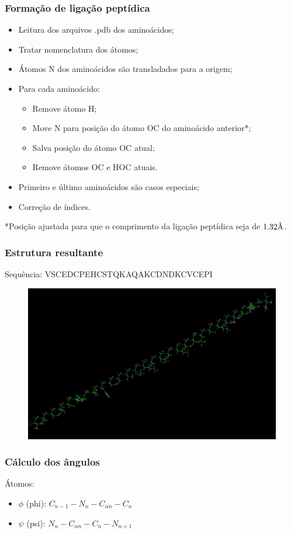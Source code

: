 \documentclass{beamer}
\newcommand{\angstrom}{\textup{\AA}}
\begin{document}
\begin{frame}
\frametitle{Formação de ligação peptídica}
\begin{itemize}
\item Leitura dos arquivos .pdb dos aminoácidos;
\item Tratar nomenclatura dos átomos;
\item Átomos N dos aminoácidos são transladados para a origem;
\item Para cada aminoácido:
\begin{itemize}
 \item Remove átomo H;
 \item Move N para posição do átomo OC do aminoácido anterior*;
 \item Salva posição do átomo OC atual;
 \item Remove átomos OC e HOC atuais.
\end{itemize}
\item Primeiro e último aminoácidos são casos especiais;
\item Correção de índices.
\end{itemize}
\footnotesize{
*Posição ajustada para que o comprimento da ligação peptídica seja de $1.32\angstrom$.
}
\end{frame}

\begin{frame}
\frametitle{Estrutura resultante}
Sequência: VSCEDCPEHCSTQKAQAKCDNDKCVCEPI
\begin{figure}
\includegraphics[width=0.8\linewidth]{protein.png}
\end{figure}
\end{frame}

\begin{frame}
\frametitle{Cálculo dos ângulos}
Átomos:
\begin{itemize}
  \item $\phi$ (phi): $C_{n-1} - N_{n} - C_{\alpha n} - C_{n}$
  \item $\psi$ (psi): $N_{n} - C_{\alpha n} - C_{n} - N_{n+1}$
\end{itemize}
\end{frame}
\end{document}
